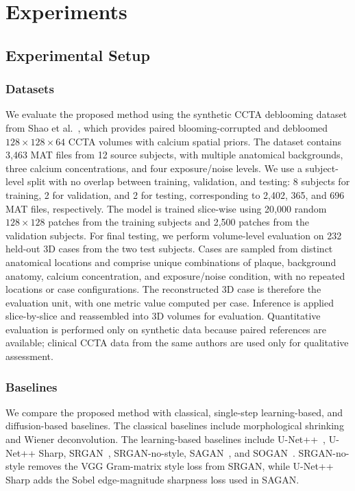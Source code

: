 \documentclass[singleLetter,times]{sagej}
\begin{document}
\section{Experiments}

\subsection{Experimental Setup}

\subsubsection{Datasets}

We evaluate the proposed method using the synthetic CCTA deblooming dataset from Shao et al.~\cite{shao2026deblooming}, which provides paired blooming-corrupted and debloomed $128 \times 128 \times 64$ CCTA volumes with calcium spatial priors. The dataset contains 3{,}463 MAT files from 12 source subjects, with multiple anatomical backgrounds, three calcium concentrations, and four exposure/noise levels. We use a subject-level split with no overlap between training, validation, and testing: 8 subjects for training, 2 for validation, and 2 for testing, corresponding to 2{,}402, 365, and 696 MAT files, respectively.
The model is trained slice-wise using 20{,}000 random $128 \times 128$ patches from the training subjects and 2{,}500 patches from the validation subjects. For final testing, we perform volume-level evaluation on 232 held-out 3D cases from the two test subjects. Cases are sampled from distinct anatomical locations and comprise unique combinations of plaque, background anatomy, calcium concentration, and exposure/noise condition, with no repeated locations or case configurations. The reconstructed 3D case is therefore the evaluation unit, with one metric value computed per case. Inference is applied slice-by-slice and reassembled into 3D volumes for evaluation. Quantitative evaluation is performed only on synthetic data because paired references are available; clinical CCTA data from the same authors are used only for qualitative assessment.

\subsubsection{Baselines}
We compare the proposed method with classical, single-step learning-based, and diffusion-based baselines. The classical baselines include morphological shrinking and Wiener deconvolution. The learning-based baselines include U-Net++~\cite{zhou2018unetnestedunetarchitecture}, U-Net++ Sharp, SRGAN~\cite{CT_SRGAN}, SRGAN-no-style, SAGAN~\cite{yi2018sharpness}, and SOGAN~\cite{ZHAO_sem}. SRGAN-no-style removes the VGG Gram-matrix style loss from SRGAN, while U-Net++ Sharp adds the Sobel edge-magnitude sharpness loss used in SAGAN.
\end{document}
